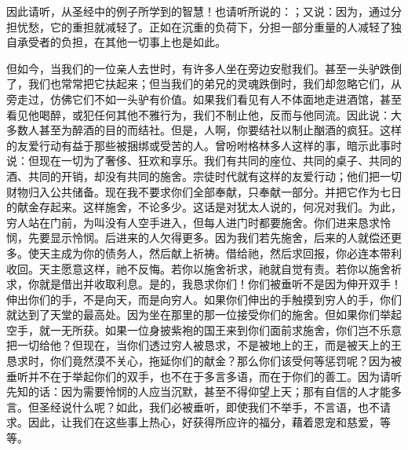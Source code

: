 因此请听，从圣经中的例子所学到的智慧！也请听所说的：；又说：因为，通过分担忧愁，它的重担就减轻了。正如在沉重的负荷下，分担一部分重量的人减轻了独自承受者的负担，在其他一切事上也是如此。\par

但如今，当我们的一位亲人去世时，有许多人坐在旁边安慰我们。甚至一头驴跌倒了，我们也常常把它扶起来；但当我们的弟兄的灵魂跌倒时，我们却忽略它们，从旁走过，仿佛它们不如一头驴有价值。如果我们看见有人不体面地走进酒馆，甚至看见他喝醉，或犯任何其他不雅行为，我们不制止他，反而与他同流。因此说：大多数人甚至为醉酒的目的而结社。但是，人啊，你要结社以制止酗酒的疯狂。这样的友爱行动有益于那些被捆绑或受苦的人。曾吩咐格林多人这样的事，暗示此事时说：但现在一切为了奢侈、狂欢和享乐。我们有共同的座位、共同的桌子、共同的酒、共同的开销，却没有共同的施舍。宗徒时代就有这样的友爱行动；他们把一切财物归入公共储备。现在我不要求你们全部奉献，只奉献一部分。并把它作为七日的献金存起来。这样施舍，不论多少。这话是对犹太人说的，何况对我们。为此，穷人站在门前，为叫没有人空手进入，但每人进门时都要施舍。你们进来恳求怜悯，先要显示怜悯。后进来的人欠得更多。因为我们若先施舍，后来的人就偿还更多。使天主成为你的债务人，然后献上祈祷。借给祂，然后求回报，你必连本带利收回。天主愿意这样，祂不反悔。若你以施舍祈求，祂就自觉有责。若你以施舍祈求，你就是借出并收取利息。是的，我恳求你们！你们被垂听不是因为伸开双手！伸出你们的手，不是向天，而是向穷人。如果你们伸出的手触摸到穷人的手，你们就达到了天堂的最高处。因为坐在那里的那一位接受你们的施舍。但如果你们举起空手，就一无所获。如果一位身披紫袍的国王来到你们面前求施舍，你们岂不乐意把一切给他？但现在，当你们透过穷人被恳求，不是被地上的王，而是被天上的王恳求时，你们竟然漠不关心，拖延你们的献金？那么你们该受何等惩罚呢？因为被垂听并不在于举起你们的双手，也不在于多言多语，而在于你们的善工。因为请听先知的话：因为需要怜悯的人应当沉默，甚至不得仰望上天；那有自信的人才能多言。但圣经说什么呢？如此，我们必被垂听，即使我们不举手，不言语，也不请求。因此，让我们在这些事上热心，好获得所应许的福分，藉着恩宠和慈爱，等等。\par

